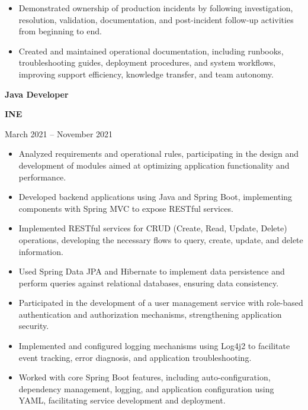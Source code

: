 \documentclass[10pt,letterpaper]{article}
\newcommand{\jobtitle}[1]{
    {\bfseries #1}
}
\newcommand{\company}[1]{
    {\bfseries\color{DarkGray} #1}
}
\newcommand{\jobdate}[1]{
    {\color{MediumGray} #1}
}
\begin{document}
\begin{itemize}
    \item Demonstrated ownership of production incidents by following investigation, resolution, validation, documentation, and post-incident follow-up activities from beginning to end.

    \item Created and maintained operational documentation, including runbooks, troubleshooting guides, deployment procedures, and system workflows, improving support efficiency, knowledge transfer, and team autonomy.

\end{itemize}


\jobtitle{Java Developer} \textbar{}
\company{INE}
\hfill \textbar{}
\jobdate{March 2021 -- November 2021}

\begin{itemize}

    \item Analyzed requirements and operational rules, participating in the design and development of modules aimed at optimizing application functionality and performance.

    \item Developed backend applications using Java and Spring Boot, implementing components with Spring MVC to expose RESTful services.

    \item Implemented RESTful services for CRUD (Create, Read, Update, Delete) operations, developing the necessary flows to query, create, update, and delete information.

    \item Used Spring Data JPA and Hibernate to implement data persistence and perform queries against relational databases, ensuring data consistency.

    \item Participated in the development of a user management service with role-based authentication and authorization mechanisms, strengthening application security.

    \item Implemented and configured logging mechanisms using Log4j2 to facilitate event tracking, error diagnosis, and application troubleshooting.

    \item Worked with core Spring Boot features, including auto-configuration, dependency management, logging, and application configuration using YAML, facilitating service development and deployment.

\end{itemize}
\end{document}
